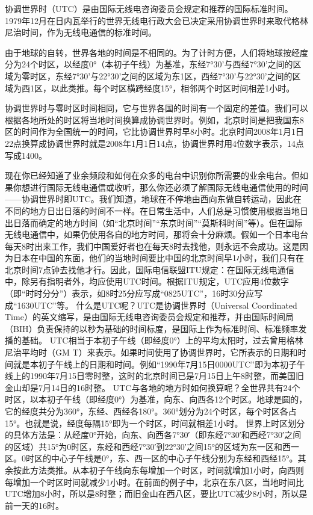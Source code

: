 \documentclass[12pt,UTF8]{ctexbook}
\begin{document}
协调世界时（UTC）是由国际无线电咨询委员会规定和推荐的国际标准时间。1979年12月在日内瓦举行的世界无线电行政大会已决定采用协调世界时来取代格林尼治时间，作为无线电通信的标准时间。

由于地球的自转，世界各地的时间是不相同的。为了计时方便，人们将地球按经度分为24个时区，以经度0°（本初子午线）为基准，东经7°30'与西经7°30'之间的区域为零时区，东经7°30'与22°30'之间的区域为东1区，西经7°30'与22°30'之间的区域为西1区，以此类推。每个时区横跨经度15°，相邻两个时区时间相差1小时。

协调世界时与零时区时间相同，它与世界各国的时间有一个固定的差值。我们可以根据各地所处的时区将当地时间换算成协调世界时。例如，北京时间是把我国东8区的时间作为全国统一的时间，它比协调世界时早8小时。北京时间2008年1月1日22点换算成协调世界时就是2008年1月1日14点，协调世界时用4位数字表示，14点写成1400。

现在你已经知道了业余频段和如何在众多的电台中识别你所需要的业余电台。但如果你想进行国际无线电通信或收听，那么你还必须了解国际无线电通信使用的时间——协调世界时即UTC。我们知道，地球在不停地由西向东做自转运动，因此在不同的地方日出日落的时间不一样。在日常生活中，人们总是习惯使用根据当地日出日落而确定的地方时间（如“北京时间”“东京时间”“莫斯科时间”等）。但在国际无线电通信中，如果仍使用各自的地方时间，那将会十分麻烦。假如一个日本电台每天8时出来工作，我们中国爱好者也在每天8时去找他，则永远不会成功。这是因为日本在中国的东面，他们的当地时间要比中国的北京时间早1小时，我们只有在北京时间7点钟去找他才行。因此，国际电信联盟ITU规定：在国际无线电通信中，除另有指明者外，均应使用UTC时间。根据ITU规定，UTC应用4位数字（即“时时分分”）表示，如8时25分应写成“0825UTC”，16时30分应写成“1630UTC”等。
什么是UTC呢？UTC是协调世界时（Universal Coordinated Time）的英文缩写，是由国际无线电咨询委员会规定和推荐，并由国际时间局（BIH）负责保持的以秒为基础的时间标度，是国际上作为标准时间、标准频率发播的基础。
UTC相当于本初子午线（即经度0°）上的平均太阳时，过去曾用格林尼治平均时（GM T）来表示。如果时间使用了协调世界时，它所表示的日期和时间就是本初子午线上的日期和时间。例如“1990年7月15日0000UTC”即为本初子午线上的1990年7月15日零时整，这时的北京时间已是7月15日上午8时整，而美国旧金山却是7月14日的16时整。
UTC与各地的地方时如何换算呢？全世界共有24个时区，以本初子午线（即经度0°）为基准，向东、向西各12个时区。地球是圆的，它的经度共分为360°，东经、西经各180°。360°划分为24个时区，每个时区各占15°。也就是说，经度每隔15°即为一个时区，时间就相差1小时。
世界上时区划分的具体方法是：从经度0°开始，向东、向西各7°30′（即东经7°30′和西经7°30′之间的区域）共15°为0时区，东经和西经7°30′到22°30′之间15°的区域为东一区和西一区。0时区的中心子午线是0°，东、西一区的中心子午线分别为东经和西经15°。其余按此方法类推。从本初子午线向东每增加一个时区，时间就增加1小时，向西则每增加一个时区时间就减少1小时。在前面的例子中，北京在东八区，当地时间比UTC增加8小时，所以是8时整；而旧金山在西八区，要比UTC减少8小时，所以是前一天的16时。
\end{document}

